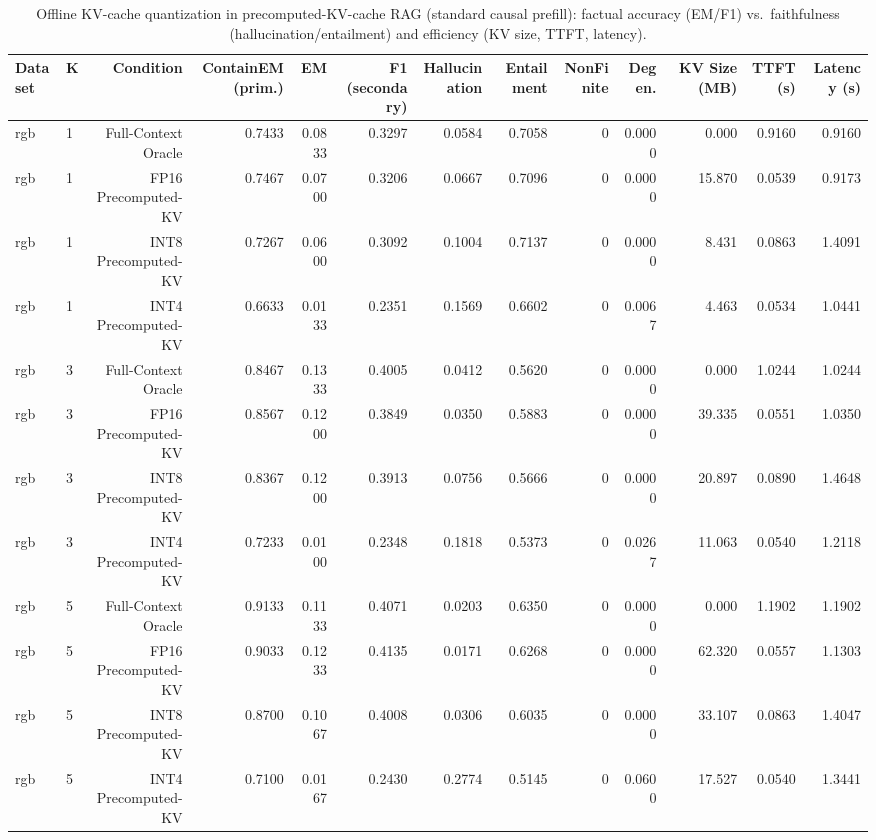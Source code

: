 \begin{table}[t]
\centering
\small
\begin{tabular}{llrrrrrrrrrrr}
\toprule
Dataset & K & Condition & ContainEM (prim.) & EM & F1 (secondary) & Hallucination & Entailment & NonFinite & Degen. & KV Size (MB) & TTFT (s) & Latency (s) \\
\midrule
rgb & 1 & Full-Context Oracle & 0.7433 & 0.0833 & 0.3297 & 0.0584 & 0.7058 & 0 & 0.0000 & 0.000 & 0.9160 & 0.9160 \\
rgb & 1 & FP16 Precomputed-KV & 0.7467 & 0.0700 & 0.3206 & 0.0667 & 0.7096 & 0 & 0.0000 & 15.870 & 0.0539 & 0.9173 \\
rgb & 1 & INT8 Precomputed-KV & 0.7267 & 0.0600 & 0.3092 & 0.1004 & 0.7137 & 0 & 0.0000 & 8.431 & 0.0863 & 1.4091 \\
rgb & 1 & INT4 Precomputed-KV & 0.6633 & 0.0133 & 0.2351 & 0.1569 & 0.6602 & 0 & 0.0067 & 4.463 & 0.0534 & 1.0441 \\
rgb & 3 & Full-Context Oracle & 0.8467 & 0.1333 & 0.4005 & 0.0412 & 0.5620 & 0 & 0.0000 & 0.000 & 1.0244 & 1.0244 \\
rgb & 3 & FP16 Precomputed-KV & 0.8567 & 0.1200 & 0.3849 & 0.0350 & 0.5883 & 0 & 0.0000 & 39.335 & 0.0551 & 1.0350 \\
rgb & 3 & INT8 Precomputed-KV & 0.8367 & 0.1200 & 0.3913 & 0.0756 & 0.5666 & 0 & 0.0000 & 20.897 & 0.0890 & 1.4648 \\
rgb & 3 & INT4 Precomputed-KV & 0.7233 & 0.0100 & 0.2348 & 0.1818 & 0.5373 & 0 & 0.0267 & 11.063 & 0.0540 & 1.2118 \\
rgb & 5 & Full-Context Oracle & 0.9133 & 0.1133 & 0.4071 & 0.0203 & 0.6350 & 0 & 0.0000 & 0.000 & 1.1902 & 1.1902 \\
rgb & 5 & FP16 Precomputed-KV & 0.9033 & 0.1233 & 0.4135 & 0.0171 & 0.6268 & 0 & 0.0000 & 62.320 & 0.0557 & 1.1303 \\
rgb & 5 & INT8 Precomputed-KV & 0.8700 & 0.1067 & 0.4008 & 0.0306 & 0.6035 & 0 & 0.0000 & 33.107 & 0.0863 & 1.4047 \\
rgb & 5 & INT4 Precomputed-KV & 0.7100 & 0.0167 & 0.2430 & 0.2774 & 0.5145 & 0 & 0.0600 & 17.527 & 0.0540 & 1.3441 \\
\bottomrule
\end{tabular}
\caption{Offline KV-cache quantization in precomputed-KV-cache RAG (standard causal prefill): factual accuracy (EM/F1) vs.\ faithfulness (hallucination/entailment) and efficiency (KV size, TTFT, latency).}
\label{tab:main}
\end{table}
